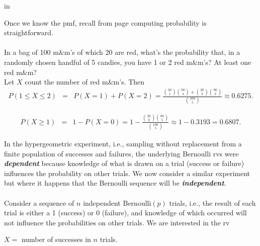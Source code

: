 \documentclass[12pt]{article}
\begin{document}
 in

\noindent Once we know the pmf, recall from page \pageref{pmfcalc} computing probability is straightforward.\\

\\
In a bag of 100 m\&m's of which 20 are red, what's the probability that, in a randomly chosen handful of 5 candies, you have 1 or 2 red m\&m's?  At least one red m\&m?\\

Let $X$ count the number of red m\&m's. Then
\begin{eqnarray*}
P(1\le X\le 2) &=& P(X=1)+P(X=2) = \frac{{20\choose 1}{80\choose 4}+{20\choose 2}{80\choose 3}}{{100\choose 5}}\approx 0.6275.\end{eqnarray*}

\begin{eqnarray*}
P(X\ge 1) &=& 1-P(X=0) = 1 - \frac {{20\choose 0}{80\choose 5}}{{100\choose 5}} \approx 1 - 0.3193 = 0.6807.\end{eqnarray*}





\newpage

\noindent In the hypergeometric experiment, i.e., sampling without replacement from a finite population of successes and failures, the underlying Bernoulli rvs were
{\bf\em dependent} because knowledge of what is drawn on a trial (success or failure) influences the probability on other trials.  We now consider a similar experiment but where it happens that the Bernoulli sequence will be {\bf\em independent}.\\


\label{d:binomialnp}\\

\noindent Consider a sequence of $n$ independent Bernoulli$(p)$ trials, i.e., the result of each trial is either a 1 (success) or 0 (failure), and knowledge of which occurred will not influence the probabilities on other trials.  We are interested in the rv

$X =$ number of successes in $n$ trials.\\
\end{document}
